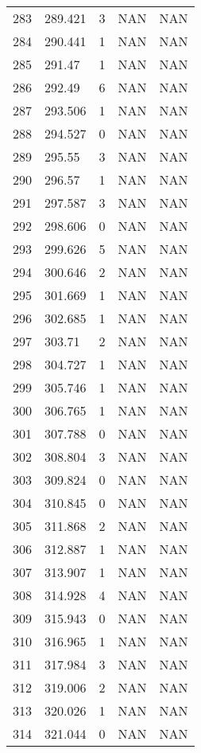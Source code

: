 \documentclass{article}
\begin{document}
\begin{longtable}{@{}lllll@{}}
				283 & 289.421 & 3    & NAN  & NAN  \\
				284 & 290.441 & 1    & NAN  & NAN  \\
				285 & 291.47  & 1    & NAN  & NAN  \\
				286 & 292.49  & 6    & NAN  & NAN  \\
				287 & 293.506 & 1    & NAN  & NAN  \\
				288 & 294.527 & 0    & NAN  & NAN  \\
				289 & 295.55  & 3    & NAN  & NAN  \\
				290 & 296.57  & 1    & NAN  & NAN  \\
				291 & 297.587 & 3    & NAN  & NAN  \\
				292 & 298.606 & 0    & NAN  & NAN  \\
				293 & 299.626 & 5    & NAN  & NAN  \\
				294 & 300.646 & 2    & NAN  & NAN  \\
				295 & 301.669 & 1    & NAN  & NAN  \\
				296 & 302.685 & 1    & NAN  & NAN  \\
				297 & 303.71  & 2    & NAN  & NAN  \\
				298 & 304.727 & 1    & NAN  & NAN  \\
				299 & 305.746 & 1    & NAN  & NAN  \\
				300 & 306.765 & 1    & NAN  & NAN  \\
				301 & 307.788 & 0    & NAN  & NAN  \\
				302 & 308.804 & 3    & NAN  & NAN  \\
				303 & 309.824 & 0    & NAN  & NAN  \\
				304 & 310.845 & 0    & NAN  & NAN  \\
				305 & 311.868 & 2    & NAN  & NAN  \\
				306 & 312.887 & 1    & NAN  & NAN  \\
				307 & 313.907 & 1    & NAN  & NAN  \\
				308 & 314.928 & 4    & NAN  & NAN  \\
				309 & 315.943 & 0    & NAN  & NAN  \\
				310 & 316.965 & 1    & NAN  & NAN  \\
				311 & 317.984 & 3    & NAN  & NAN  \\
				312 & 319.006 & 2    & NAN  & NAN  \\
				313 & 320.026 & 1    & NAN  & NAN  \\
				314 & 321.044 & 0    & NAN  & NAN  \\

\end{longtable}
\end{document}
